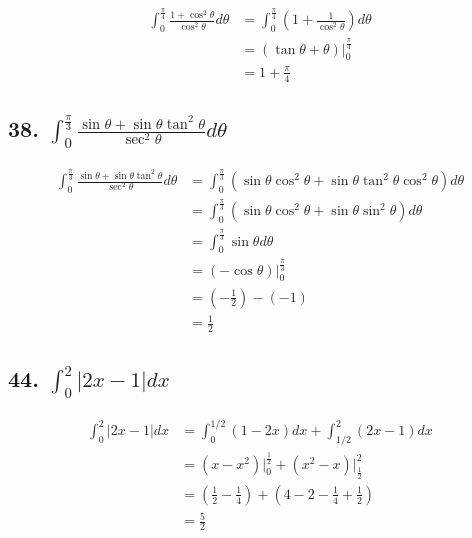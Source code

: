 \documentclass{article}
\begin{document}
    $$\begin{aligned}
        \int_0^{\frac \pi 4}\frac{1 + \cos ^2 \theta}{\cos ^2 \theta} d\theta &= \int_0^{\frac \pi 4}(1 + \frac{1}{\cos ^2\theta }) d\theta \\
        &= (\tan \theta + \theta) \biggl|_{0}^{\frac{\pi}{4}} \\
        &= 1 + \frac \pi 4
    \end{aligned}$$

    \subsection*{38. $\int_{0}^{\frac{\pi}{3}} \frac{\sin \theta + \sin \theta \tan ^2 \theta}{\sec^2 \theta} d\theta$}

    $$\begin{aligned}
        \int_{0}^{\frac{\pi}{3}} \frac{\sin \theta + \sin \theta \tan ^2 \theta}{\sec^2 \theta} d\theta &= \int_{0}^{\frac \pi 3}(\sin \theta \cos^2 \theta + \sin \theta \tan ^2 \theta \cos ^2 \theta) d\theta \\
        &= \int_{0}^{\frac \pi 3}(\sin \theta \cos ^2 \theta + \sin \theta \sin ^2\theta) d \theta \\
        &= \int_{0}^{\frac \pi 3}\sin \theta d \theta \\
        &= (-\cos \theta) \biggl|_{0}^{\frac \pi 3} \\
        &= (- \frac 1 2) - (-1) \\
        &= \frac 1 2
    \end{aligned}$$

    \subsection*{44. $\int_0^2|2x - 1|dx$}

    $$\begin{aligned}
        \int_0^2|2x - 1|dx &= \int_0^{1/2}(1 - 2x) dx + \int_{1/2}^2(2x - 1)dx \\
        &= (x - x^2)\biggl|_{0}^{\frac 1 2} + (x^2 - x)\biggl | _{\frac 1 2}^2 \\
        &= (\frac 1 2 - \frac 1 4) + (4 - 2 - \frac 1 4 + \frac 1 2) \\
        &= \frac 5 2
    \end{aligned}$$
\end{document}
